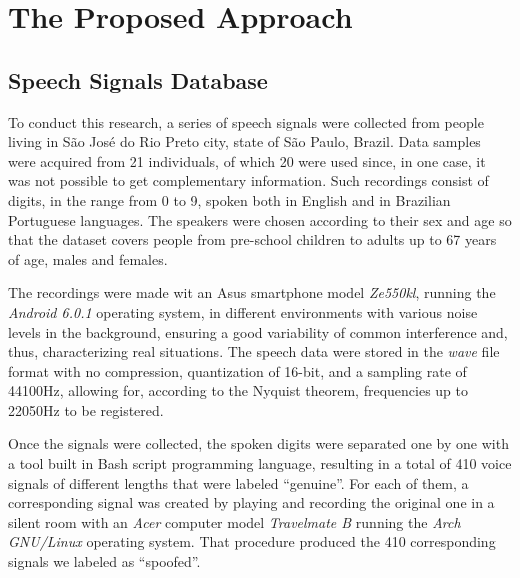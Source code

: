 \section{The Proposed Approach}
\label{sec:propApproach}
\subsection{Speech Signals Database}
\par To conduct this research, a series of speech signals were collected from people living in São José do Rio Preto city, state of São Paulo, Brazil. Data samples were acquired from 21 individuals, of which 20 were used since, in one case, it was not possible to get complementary information. Such recordings consist of digits, in the range from 0 to 9, spoken both in English and in Brazilian Portuguese languages. The speakers were chosen according to their sex and age so that the dataset covers people from pre-school children to adults up to 67 years of age, males and females.
\\
\par The recordings were made wit an Asus smartphone model \textit{Ze550kl}, running the \textit{Android 6.0.1} operating system, in different environments with various noise levels in the background, ensuring a good variability of common interference and, thus, characterizing real situations. The speech data were stored in the \textit{wave} file format with no compression, quantization of 16-bit, and a sampling rate of 44100Hz, allowing for, according to the Nyquist theorem, frequencies up to 22050Hz to be registered.
\\
\par Once the signals were collected, the spoken digits were separated one by one with a tool built in Bash script programming language, resulting in a total of 410 voice signals of different lengths that were labeled ``genuine''. For each of them, a corresponding signal was created by playing and recording the original one in a silent room with an \textit{Acer} computer model \textit{Travelmate B} running the \textit{Arch GNU/Linux} operating system. That procedure produced the 410 corresponding signals we labeled as ``spoofed''.
